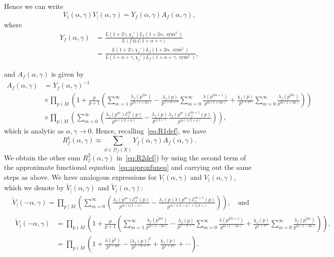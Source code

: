 \documentclass[11pt,reqno]{amsart} \usepackage{fullpage}
\newcommand{\ra}{\rightarrow}
\newcommand\be{\begin{equation}}
\newcommand\ee{\end{equation}}
\newcommand{\Lsym}[2][]{L_f#1\left(#2,\sym^2\right)}
\newcommand{\Lchi}[2][]{L(#2,\chi_f#1)}
\DeclareMathOperator{\sym}{sym}
\newcommand{\D}{\mathcal D_f}
\newcommand{\E}{\mathcal E_f}
\numberwithin{equation}{section}
\begin{document}
Hence we can write
\be V_\nmid(\alpha,\gamma)V_\mid(\alpha,\gamma)
=Y_f(\alpha,\gamma)A_f(\alpha,\gamma), \ee
where
\be\label{eq:Yfdef}
\begin{aligned}
  Y_f(\alpha,\gamma)
  &=\frac{\Lchi[']{1+2\gamma}\Lsym{1+2\alpha}}{L(f\otimes f,1+\alpha+\gamma)} \\
  &=\frac{\Lchi[']{1+2\gamma}\Lsym{1+2\alpha}}
  {\Lchi[']{1+\alpha+\gamma}\Lsym{1+\alpha+\gamma}},
\end{aligned}\ee
  
and $A_f(\alpha,\gamma)$ is given by
\be\label{eq:Afdef} \begin{aligned}
  A_f(\alpha,\gamma) &= Y_f(\alpha,\gamma)^{-1} \\
  &\times
  \prod_{p\nmid M}
  \left(1+\frac p{p+1}\left(
      \sum_{m=1}^\infty
      \frac{\lambda_f(p^{2m})}{p^{m(1+2\alpha)}}
      -\frac{\lambda_f(p)}{p^{1+\alpha+\gamma}}
      \sum_{m=0}^\infty
      \frac{\lambda(p^{2m+1})}{p^{m(1+2\alpha)}}
      +\frac{\chi_f(p)}{p^{1+2\gamma}}
      \sum_{m=0}^\infty
      \frac{\lambda_f(p^{2m})}{p^{m(1+2\alpha)}}
    \right)
  \right) \\
  &\times
  \prod_{p\mid M}
  \left(
    \sum_{m=0}^\infty\left(
      \frac{\lambda_f(p^{m})\E^{m}(p)}{p^{m(1/2+\alpha)}}
      -\frac{\lambda_f(p)}{p^{1/2+\gamma}}
      \frac{\lambda_f(p^{m})\E^{m+1}(p)}
      {p^{m(1/2+\alpha)}}
    \right)
  \right),
\end{aligned} \ee
which is analytic as $\alpha,\gamma\ra0$. Hence, recalling~\eqref{eq:R1def}, we have
\be R^1_f(\alpha,\gamma)\approx\sum_{d\in\D(X)}Y_f(\alpha,\gamma)A_f(\alpha,\gamma).\ee
We obtain the other sum $R_f^2(\alpha,\gamma)$ in~\eqref{eq:R2def}) by using the
second term of the approximate functional equation~\eqref{eq:approxfuneq} and
carrying out the same steps as above. We have analogous expressions for
$V_\mid(\alpha,\gamma)$ and $V_\nmid(\alpha,\gamma)$, which we denote by
$\tilde{V}_\mid(\alpha,\gamma)$ and $\tilde{V}_\nmid(\alpha,\gamma)$:
\begin{align}
  &\tilde{V}_\mid(-\alpha,\gamma)=\prod_{p\mid M}
  \left(
    \sum_{m=0}^\infty\left(
      \frac{\overline{\lambda_f(p^{m})}\E^{m}(p)}{p^{m(1/2-\alpha)}}
      -\frac{\lambda_f(p)\overline{\lambda(p^{m})}\E^{m+1}(p)}
      {p^{m(1/2-\alpha)+1/2+\gamma}}
    \right)
  \right), \quad\text{and} \\
  &\begin{aligned}\tilde{V}_\nmid(-\alpha,\gamma)&=\prod_{p\nmid M}
    \left(1+\frac p{p+1}\left(
        \sum_{m=1}^\infty
        \frac{\overline{\lambda_f(p^{2m})}}{p^{m(1-2\alpha)}}
        -\frac{\lambda_f(p)}{p^{1-\alpha+\gamma}}
        \sum_{m=0}^\infty
        \frac{\overline{\lambda(p^{2m+1})}}{p^{m(1-2\alpha)}}
        +\frac{\chi_f(p)}{p^{1+2\gamma}}
        \sum_{m=0}^\infty
        \frac{\overline{\lambda_f(p^{2m})}}{p^{m(1-2\alpha)}}
      \right)
    \right), \\
    &=\prod_{p\nmid M}\left(1+\frac{\overline{\lambda(p^2)}}{p^{1-2\alpha}}
      -\frac{\left|\lambda_f(p)\right|^2}{p^{1-\alpha+\gamma}}
      +\frac{\chi_f(p)}{p^{1+2\gamma}}+\cdots\right).
  \end{aligned}
\label{eq:tildeVnmid}
\end{align}
\end{document}
